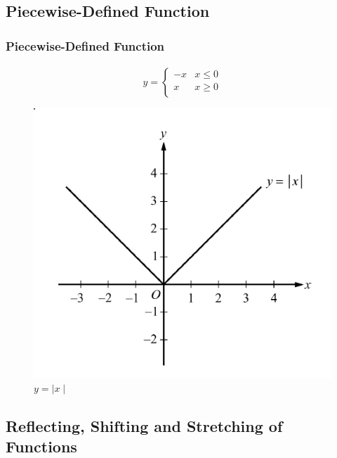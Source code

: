 \documentclass[
	11pt, %
	handout,
]{beamer}
\begin{document}




\subsection{Piecewise-Defined Function}



\begin{frame}
	\frametitle{Piecewise-Defined Function}
	\framesubtitle{}

\[y= \begin{cases} 
      -x & x\leq 0 \\
      x &  x\geq 0 \\
   \end{cases}
\]
	\begin{figure}
		\includegraphics[width=0.5\linewidth]{Piecewise_Defined_Function.png}
		\caption{$y = \mid x \mid$}
	\end{figure}

\end{frame}

\subsection{Reflecting, Shifting and Stretching of Functions}

\end{document}
